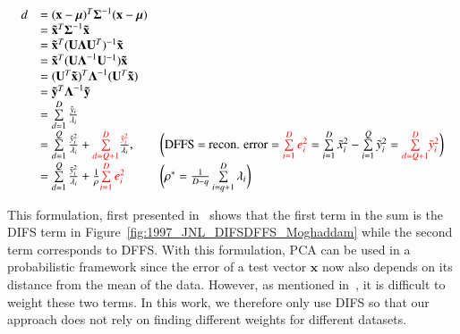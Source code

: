 \begin{Body}
\begin{equation}
\begin{array}{lllllll}
d &= (\mathbf{x}-\boldsymbol\mu)^T\boldsymbol\Sigma^{-1}(\mathbf{x}-\boldsymbol\mu)\\
&=\mathbf{\tilde{x}}^T\boldsymbol\Sigma^{-1}\mathbf{\tilde{x}}\\
&=\mathbf{\tilde{x}}^T(\mathbf{U}\boldsymbol\Lambda\mathbf{U}^T)^{-1}\mathbf{\tilde{x}}\\
&=\mathbf{\tilde{x}}^T(\mathbf{U}\boldsymbol\Lambda^{-1}\mathbf{U}^{-1})\mathbf{\tilde{x}}\\
&=(\mathbf{U}^T\mathbf{\tilde{x}})^T\boldsymbol\Lambda^{-1}(\mathbf{U}^T\mathbf{\tilde{x}})	\\
&=\mathbf{\tilde{y}}^T\boldsymbol\Lambda^{-1}\mathbf{\tilde{y}}\\
&=\sum\limits_{d=1}^D \frac{\tilde{y}_i}{\lambda_i}\\
&=\sum\limits_{d=1}^Q \frac{\tilde{y}_i^2}{\lambda_i} + {\color{red}\sum\limits_{d=Q+1}^D} \frac{{\color{red}\tilde{y}_i^2}}{\lambda_i}, \ \ \  & \bigg(\textrm{DFFS = recon. error}={\color{red}\sum\limits_{i=1}^D e_i^2} = \sum\limits_{i=1}^D \tilde{x}_i^2 - \sum\limits_{i=1}^Q \tilde{y}_i^2= {\color{red}\sum\limits_{d=Q+1}^D} {\color{red}\tilde{y}_i^2}\bigg)\\
&=\sum\limits_{d=1}^Q \frac{\tilde{y}_i^2}{\lambda_i} + \frac{1}{\rho} {\color{red}\sum\limits_{i=1}^D e_i^2} \ \ \ & \bigg(\rho^* = \frac{1}{D-q}\sum\limits_{i=q+1}^D \lambda_i\bigg)\\
\end{array}
\label{Eqn:MoghaddamLikelihood}
\end{equation}

This formulation, first presented in~\cite{1997_JNL_EigenTRK_Moghaddam} shows that the first term in the sum is the DIFS term in Figure~\ref{fig:1997_JNL_DIFSDFFS_Moghaddam} while the second term corresponds to DFFS.  With this formulation, PCA can be used in a probabilistic framework since the error of a test vector $\mathbf{x}$ now also depends on its distance from the mean of the data.  However, as mentioned in~\cite{2008_JNL_subspaceTRK_Ross}, it is difficult to weight these two terms.  In this work, we therefore only use DIFS so that our approach does not rely on finding different weights for different datasets.


%
%



\end{Body}
